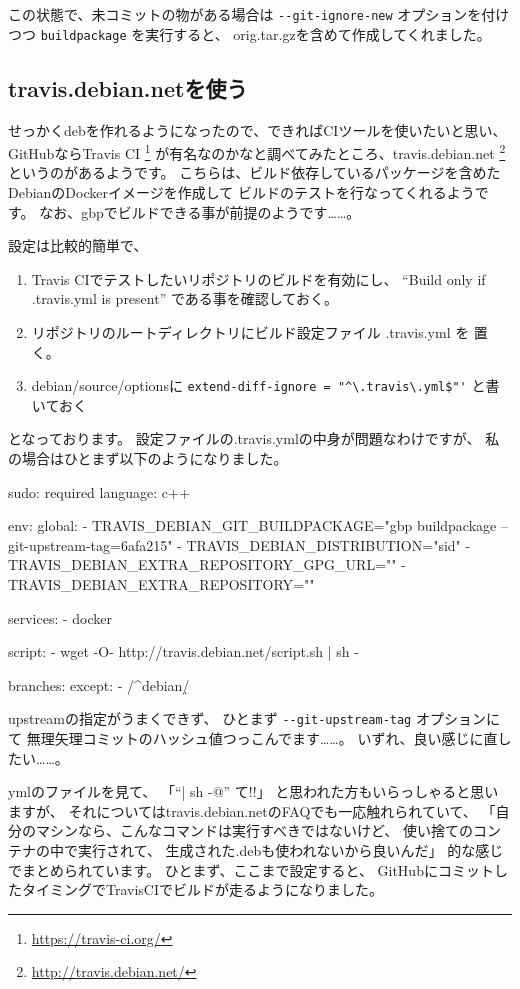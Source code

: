 \documentclass[mingoth,a4paper]{jsarticle}
\begin{document}
この状態で、未コミットの物がある場合は \verb|--git-ignore-new|
オプションを付けつつ \texttt{buildpackage} を実行すると、
orig.tar.gzを含めて作成してくれました。

\subsection{travis.debian.netを使う}

せっかくdebを作れるようになったので、できればCIツールを使いたいと思い、
GitHubならTravis CI
\footnote{\url{https://travis-ci.org/}}
が有名なのかなと調べてみたところ、travis.debian.net
\footnote{\url{http://travis.debian.net/}}
というのがあるようです。
こちらは、ビルド依存しているパッケージを含めたDebianのDockerイメージを作成して
ビルドのテストを行なってくれるようです。
なお、gbpでビルドできる事が前提のようです……。

設定は比較的簡単で、
\begin{enumerate}
 \item Travis CIでテストしたいリポジトリのビルドを有効にし、
       ``Build only if .travis.yml is present'' である事を確認しておく。
 \item リポジトリのルートディレクトリにビルド設定ファイル .travis.yml を
       置く。
 \item debian/source/optionsに
       \verb|extend-diff-ignore = "^\.travis\.yml$"'|
       と書いておく
\end{enumerate}
となっております。
設定ファイルの.travis.ymlの中身が問題なわけですが、
私の場合はひとまず以下のようになりました。
\begin{commandline}
sudo: required
language: c++

env:
  global:
    - TRAVIS_DEBIAN_GIT_BUILDPACKAGE="gbp buildpackage --git-upstream-tag=6afa215"
    - TRAVIS_DEBIAN_DISTRIBUTION="sid"
    - TRAVIS_DEBIAN_EXTRA_REPOSITORY_GPG_URL=""
    - TRAVIS_DEBIAN_EXTRA_REPOSITORY=""

services:
  - docker

script:
  - wget -O- http://travis.debian.net/script.sh | sh -

branches:
  except:
    - /^debian\/\d/
\end{commandline}
upstreamの指定がうまくできず、
ひとまず \verb|--git-upstream-tag| オプションにて
無理矢理コミットのハッシュ値つっこんでます……。
いずれ、良い感じに直したい……。

ymlのファイルを見て、
「``\verb@wget | sh -@'' て!!」
と思われた方もいらっしゃると思いますが、
それについてはtravis.debian.netのFAQでも一応触れられていて、
「自分のマシンなら、こんなコマンドは実行すべきではないけど、
使い捨てのコンテナの中で実行されて、
生成された.debも使われないから良いんだ」
的な感じでまとめられています。
ひとまず、ここまで設定すると、
GitHubにコミットしたタイミングでTravisCIでビルドが走るようになりました。
\end{document}
